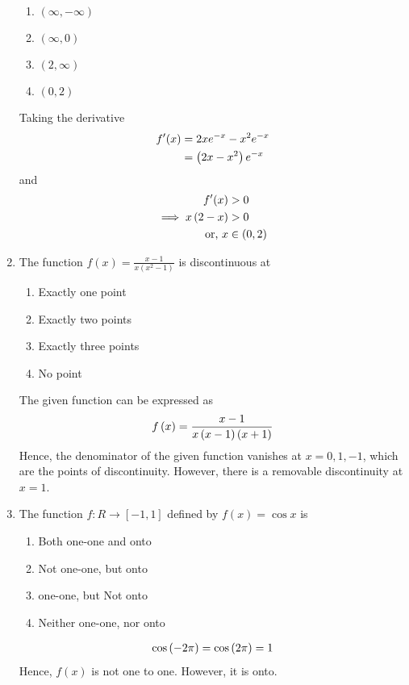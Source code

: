 \documentclass[journal,12pt,twocolumn]{IEEEtran}
\renewcommand\thesection{\arabic{section}}
\begin{document}
\begin{enumerate}[label=\thesection.\arabic*.,ref=\thesection.\theenumi]
\begin{enumerate}
    \item $\left(\infty , -\infty \right)$
    \item $\left(\infty , 0 \right)$
    \item $\left(2 , \infty \right)$
    \item $\left(0 , 2 \right)$
\end{enumerate}
\solution Taking the derivative
		\begin{align}
			f^{\prime}(x) &= 2xe^{-x} -x^2 e^{-x} 
\\
			&= \left(2x - x^2\right)e^{-x}
		\end{align}
		and 
		\begin{align}
			f^{\prime}(x) &> 0
			\\
			\implies x\left(2 - x\right) &> 0
			\\
			\text{or, } x &\in \left(0,2\right)
		\end{align}
\item The function $ f\left({x} \right) = \frac{x-1}{x\left(x^2 -1 \right)} $ is discontinuous at

\begin{enumerate}
    \item Exactly one point
    \item Exactly two points
    \item Exactly three points
    \item No point
\end{enumerate}
\solution The given function can be expressed as
		\begin{align}
			f\left(x\right) = \frac{x-1}{x\left(x-1\right)\left(x+1\right)} 
		\end{align}
Hence, the denominator of the given function vanishes at $x = 0, 1, -1$,    
which are the points of discontinuity.  However, there is a removable discontinuity at $x = 1$.
\item The function  $ f : R \rightarrow \left[-1,1 \right] $ defined by $ f\left(x \right) = \cos x $ is

\begin{enumerate}
    \item Both one-one and onto
    \item Not one-one, but onto
    \item one-one, but Not onto
    \item Neither one-one, nor onto
\end{enumerate}
\solution 
		\begin{align}
			\cos\left(-2\pi\right)
			=
			\cos\left(2\pi\right) = 1
		\end{align}
		Hence, $f(x)$ is not one to one.  However, it  is onto.





\end{enumerate}
\end{document}
